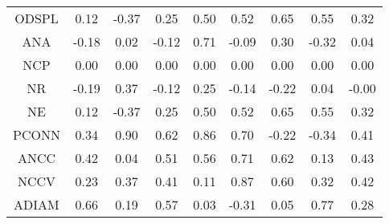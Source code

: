 \documentclass[11pt,a4paper]{report}
\begin{document}
\begin{longtable}{ | c || c | c | c | c | c | c | c || c |}
ODSPL &  \cellcolor[HTML]{FFFFFF} 0.12 &  \cellcolor[HTML]{FFF7F7} -0.37 &  \cellcolor[HTML]{F7F7FF} 0.25 &  \cellcolor[HTML]{EFEFFF} 0.50 &  \cellcolor[HTML]{EFEFFF} 0.52 &  \cellcolor[HTML]{EFEFFF} 0.65 &  \cellcolor[HTML]{EFEFFF} 0.55 &  \cellcolor[HTML]{F7F7FF} 0.32 \\
ANA &  \cellcolor[HTML]{FFF7F7} -0.18 &  \cellcolor[HTML]{FFFFFF} 0.02 &  \cellcolor[HTML]{FFFFFF} -0.12 &  \cellcolor[HTML]{EFEFFF} 0.71 &  \cellcolor[HTML]{FFFFFF} -0.09 &  \cellcolor[HTML]{F7F7FF} 0.30 &  \cellcolor[HTML]{FFF7F7} -0.32 &  \cellcolor[HTML]{FFFFFF} 0.04 \\
NCP &  \cellcolor[HTML]{FFFFFF} 0.00 &  \cellcolor[HTML]{FFFFFF} 0.00 &  \cellcolor[HTML]{FFFFFF} 0.00 &  \cellcolor[HTML]{FFFFFF} 0.00 &  \cellcolor[HTML]{FFFFFF} 0.00 &  \cellcolor[HTML]{FFFFFF} 0.00 &  \cellcolor[HTML]{FFFFFF} 0.00 &  \cellcolor[HTML]{FFFFFF} 0.00 \\
NR &  \cellcolor[HTML]{FFF7F7} -0.19 &  \cellcolor[HTML]{F7F7FF} 0.37 &  \cellcolor[HTML]{FFFFFF} -0.12 &  \cellcolor[HTML]{F7F7FF} 0.25 &  \cellcolor[HTML]{FFFFFF} -0.14 &  \cellcolor[HTML]{FFF7F7} -0.22 &  \cellcolor[HTML]{FFFFFF} 0.04 &  \cellcolor[HTML]{FFFFFF} -0.00 \\
NE &  \cellcolor[HTML]{FFFFFF} 0.12 &  \cellcolor[HTML]{FFF7F7} -0.37 &  \cellcolor[HTML]{F7F7FF} 0.25 &  \cellcolor[HTML]{EFEFFF} 0.50 &  \cellcolor[HTML]{EFEFFF} 0.52 &  \cellcolor[HTML]{EFEFFF} 0.65 &  \cellcolor[HTML]{EFEFFF} 0.55 &  \cellcolor[HTML]{F7F7FF} 0.32 \\
PCONN &  \cellcolor[HTML]{F7F7FF} 0.34 &  \cellcolor[HTML]{E7E7FF} 0.90 &  \cellcolor[HTML]{EFEFFF} 0.62 &  \cellcolor[HTML]{E7E7FF} 0.86 &  \cellcolor[HTML]{EFEFFF} 0.70 &  \cellcolor[HTML]{FFF7F7} -0.22 &  \cellcolor[HTML]{FFF7F7} -0.34 &  \cellcolor[HTML]{F7F7FF} 0.41 \\
ANCC &  \cellcolor[HTML]{F7F7FF} 0.42 &  \cellcolor[HTML]{FFFFFF} 0.04 &  \cellcolor[HTML]{EFEFFF} 0.51 &  \cellcolor[HTML]{EFEFFF} 0.56 &  \cellcolor[HTML]{EFEFFF} 0.71 &  \cellcolor[HTML]{EFEFFF} 0.62 &  \cellcolor[HTML]{FFFFFF} 0.13 &  \cellcolor[HTML]{F7F7FF} 0.43 \\
NCCV &  \cellcolor[HTML]{F7F7FF} 0.23 &  \cellcolor[HTML]{F7F7FF} 0.37 &  \cellcolor[HTML]{F7F7FF} 0.41 &  \cellcolor[HTML]{FFFFFF} 0.11 &  \cellcolor[HTML]{E7E7FF} 0.87 &  \cellcolor[HTML]{EFEFFF} 0.60 &  \cellcolor[HTML]{F7F7FF} 0.32 &  \cellcolor[HTML]{F7F7FF} 0.42 \\
ADIAM &  \cellcolor[HTML]{EFEFFF} 0.66 &  \cellcolor[HTML]{F7F7FF} 0.19 &  \cellcolor[HTML]{EFEFFF} 0.57 &  \cellcolor[HTML]{FFFFFF} 0.03 &  \cellcolor[HTML]{FFF7F7} -0.31 &  \cellcolor[HTML]{FFFFFF} 0.05 &  \cellcolor[HTML]{EFEFFF} 0.77 &  \cellcolor[HTML]{F7F7FF} 0.28 \\

\end{longtable}
\end{document}

